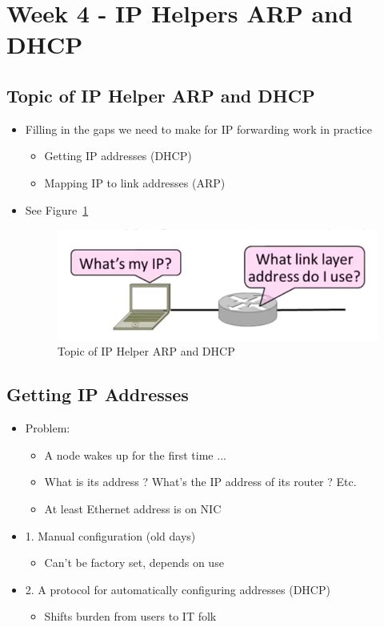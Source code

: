 \documentclass[12pt]{ctexart}   %
\begin{document}
\section{Week 4 - IP Helpers ARP and DHCP}	
	\subsection{Topic of IP Helper ARP and DHCP}
	\begin{itemize}
		\item Filling in the gaps we need to make for IP forwarding work in practice
		\begin{itemize}
			\item Getting IP addresses (DHCP)
			\item Mapping IP to link addresses (ARP)
		\end{itemize}
		\item See Figure~\ref{fig:4-6-1}
		
		\begin{figure}[h!] %
		\centering
		 \includegraphics[scale=0.7]{images/4-6-1}
		\caption{Topic of IP Helper ARP and DHCP}
		 \label{fig:4-6-1}
		 \end{figure}
	\end{itemize}
	
	\subsection{Getting IP Addresses}
	\begin{itemize}
		\item Problem:
		\begin{itemize}
			\item A node wakes up for the first time ...
			\item What is its address ? What's the IP address of its router ? Etc.
			\item At least Ethernet address is on NIC
		\end{itemize}
		
		\item {\color{blue} 1.} Manual configuration (old days)
		\begin{itemize}
			\item Can't be factory set, depends on use
		\end{itemize}
		
		\item {\color{blue} 2.} A protocol for automatically configuring addresses (DHCP)
		\begin{itemize}
			\item Shifts burden from users to IT folk
		\end{itemize}
	\end{itemize}
	
\end{document}

